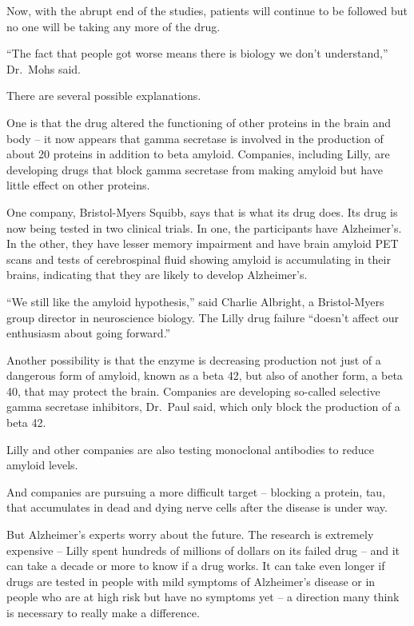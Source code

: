 ﻿\documentclass[12pt]{article}
\begin{document}
Now, with the abrupt end of the studies, patients will continue to be followed but no one will be
taking any more of the drug.

``The fact that people got worse means there is biology we don't understand,'' Dr.~Mohs said.

There are several possible explanations.

One is that the drug altered the functioning of other proteins in the brain and body -- it now
appears that gamma secretase is involved in the production of about 20 proteins in addition to beta
amyloid. Companies, including Lilly, are developing drugs that block gamma secretase from making
amyloid but have little effect on other proteins.

One company, Bristol-Myers Squibb, says that is what its drug does. Its drug is now being tested in
two clinical trials. In one, the participants have Alzheimer's. In the other, they have lesser
memory impairment and have brain amyloid PET scans and tests of cerebrospinal fluid showing amyloid
is accumulating in their brains, indicating that they are likely to develop Alzheimer's.

``We still like the amyloid hypothesis,'' said Charlie Albright, a Bristol-Myers group director in
neuroscience biology. The Lilly drug failure ``doesn't affect our enthusiasm about going forward.''

Another possibility is that the enzyme is decreasing production not just of a dangerous form of
amyloid, known as a beta 42, but also of another form, a beta 40, that may protect the brain.
Companies are developing so-called selective gamma secretase inhibitors, Dr.~Paul said, which only
block the production of a beta 42.

Lilly and other companies are also testing monoclonal antibodies to reduce amyloid levels.

And companies are pursuing a more difficult target -- blocking a protein, tau, that accumulates in
dead and dying nerve cells after the disease is under way.

But Alzheimer's experts worry about the future. The research is extremely expensive -- Lilly spent
hundreds of millions of dollars on its failed drug -- and it can take a decade or more to know if a
drug works. It can take even longer if drugs are tested in people with mild symptoms of Alzheimer's
disease or in people who are at high risk but have no symptoms yet -- a direction many think is
necessary to really make a difference.
\end{document}
